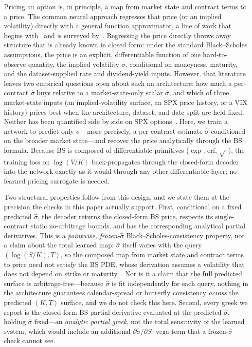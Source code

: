 \documentclass[11pt]{article}
\begin{document}
Pricing an option is, in principle, a map from market state and contract terms to a price. The
common neural approach regresses that price (or an implied volatility) directly with a general
function approximator, a line of work that begins with~\citet{Hutchinson1994Nonparametric} and is
surveyed by~\citet{RufWang2020Review}. Regressing the price directly throws away structure that is
already known in closed form: under the standard Black--Scholes assumptions, the price is an explicit,
differentiable function of one hard-to-observe quantity, the implied volatility $\sigma$, conditional
on moneyness, maturity, and the dataset-supplied rate and dividend-yield inputs. However, that
literature leaves two empirical questions open about such an architecture: how much a per-contract
$\hat\sigma$ buys relative to a market-state-only scalar $\hat\sigma$, and which of three market-state
inputs (an implied-volatility surface, an SPX price history, or a VIX history) prices best when the
architecture, dataset, and date split are held fixed. Neither has been quantified side by side on SPX
options~\citep{RufWang2020Review}. Here, we train
a network to predict only $\sigma$---more precisely, a per-contract estimate $\hat\sigma$ conditioned
on the broader market state---and recover the price analytically through the BS formula. Because BS is
composed of differentiable primitives ($\exp$, $\mathrm{erf}$, $\sqrt{\cdot}$), the training loss on
$\log(V/K)$ back-propagates through the closed-form decoder into the network exactly as it would
through any other differentiable layer; no learned pricing surrogate is needed.

Two structural properties follow from this design, and we state them at the precision the checks in
this paper actually support. First, conditional on a fixed predicted $\hat\sigma$, the decoder returns
the closed-form BS price, respects its single-contract static no-arbitrage bounds, and has the
corresponding analytical partial derivatives. This is a \emph{pointwise, frozen-$\hat\sigma$}
Black--Scholes-consistency property, not a claim about the total learned map: $\hat\sigma$ itself
varies with the query $(\log(S/K), T)$, so the composed map from market state and contract terms to
price need not satisfy the BS PDE, whose derivation assumes a volatility that does not depend on
strike or maturity~\citep{Dupire1994Smile}. Nor is it a claim that the full predicted surface is
arbitrage-free---because $\hat\sigma$ is fit independently for each query, nothing in the architecture
guarantees calendar-spread or butterfly consistency \emph{across} the predicted $(K,T)$ surface, and
we do not check this here. Second, every greek we report is the closed-form BS partial derivative
evaluated at the predicted $\hat\sigma$, holding $\hat\sigma$ fixed---an \emph{analytic partial
greek}, not the total sensitivity of the learned system, which would include an additional
$\partial\hat\sigma/\partial S \cdot \text{vega}$ term that a frozen-$\hat\sigma$ check cannot see.
\end{document}
